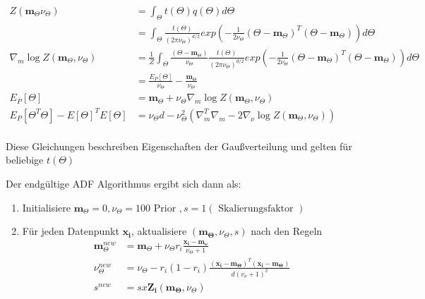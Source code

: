 \documentclass[12pt,a4paper]{scrartcl}
\numberwithin{equation}{section}
\begin{document}
{  \begin{equation}
  \begin{split}
   Z(\mathbf{m}_{\Theta} \nu_{\Theta}) &= \int_{\Theta} t(\Theta) q(\Theta) d \Theta \\ 
   &= \int_{\Theta} \frac{t(\Theta)}{(2 \pi \nu_{\Theta})^{d/2}} exp(- \frac{1}{2 \nu_{\Theta}}(\Theta - \mathbf{m}_{\Theta})^T (\Theta - \mathbf{m}_{\Theta})) d \Theta \\
   \nabla_m \log Z(\mathbf{m}_{\Theta}, \nu_{\Theta}) & = \frac{1}{Z} \int_{\Theta} \frac{(\Theta - \mathbf{m}_{\Theta})}{\nu_{\Theta}} \frac{t(\Theta)}{(2 \pi \nu_{\Theta})^{d/2}} exp(- \frac{1}{2 \nu_{\Theta}}(\Theta - \mathbf{m}_{\Theta})^T (\Theta - \mathbf{m}_{\Theta})) d \Theta \\
   &= \frac{E_P[\Theta]}{\nu_{\Theta}} - \frac{\mathbf{m}_{\Theta}}{\nu_{\Theta}} \\
   E_P[\Theta] &= \mathbf{m}_{\Theta} + \nu_{\Theta} \nabla_m \log Z(\mathbf{m}_{\Theta},\nu_{\Theta}) \\
   E_P[\Theta^T \Theta] - E[\Theta]^TE[\Theta] &= \nu_{\Theta} d - \nu_{\Theta}^2 (\nabla_m^T \nabla_m - 2 \nabla_{\nu} \log Z(\mathbf{m}_{\Theta}, \nu_{\Theta}) ) \\ 
  \end{split}
  \end{equation}

  Diese Gleichungen beschreiben Eigenschaften der Gaußverteilung und gelten für beliebige $t(\Theta)$
  
  Der endgültige ADF Algorithmus ergibt sich dann als: 
  
  \begin{enumerate}
   \item Initialisiere $\mathbf{m}_{\Theta} = 0, \nu_{\Theta} = 100 \text{ Prior }, s = 1 (\text{ Skalierungsfaktor })$
   \item Für jeden Datenpunkt $\mathbf{x_i}$, aktualisiere $(\mathbf{m_{\Theta}}, \nu_{\Theta},s)$ nach den Regeln
   \begin{equation}
    \begin{split}
      \mathbf{m}_{\Theta}^{new} &= \mathbf{m}_{\Theta} + \nu_{\Theta} r_i \frac{\mathbf{x_i - m_{\nu}}}{\nu_{\Theta} + 1} \\
      \nu_{\Theta}^{new} &= \nu_{\Theta} -  r_i (1 - r_i) \frac{(\mathbf{x_i - m_{\Theta}})^T (\mathbf{x_i - m_{\Theta}})}{d(v_{\nu} +1)^2} \\
      s^{new} &= s x \mathbf{Z_i}(\mathbf{m_{\Theta}}, \nu_{\Theta}) \\
    \end{split}
   \end{equation}
  \end{enumerate}

}
\end{document}
